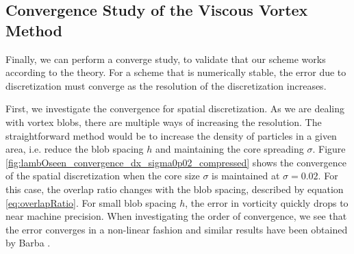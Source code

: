 

\subsection{Convergence Study of the Viscous Vortex Method}

Finally, we can perform a converge study, to validate that our scheme works according to the theory. For a scheme that is numerically stable, the error due to discretization must converge as the resolution of the discretization increases. 

First, we investigate the convergence for spatial discretization. As we are dealing with vortex blobs, there are multiple ways of increasing the resolution. The straightforward method would be to increase the density of particles in a given area, i.e. reduce the blob spacing $h$ and maintaining the core spreading $\sigma$. Figure \ref{fig:lambOseen_convergence_dx_sigma0p02_compressed} shows the convergence of the spatial discretization when the core size $\sigma$ is maintained at $\sigma=0.02$. For this case, the overlap ratio changes with the blob spacing, described by equation \ref{eq:overlapRatio}. For small blob spacing $h$, the error in vorticity quickly drops to near machine precision. When investigating the order of convergence, we see that the error converges in a non-linear fashion and similar results have been obtained by Barba \cite{Barba2004c}.

